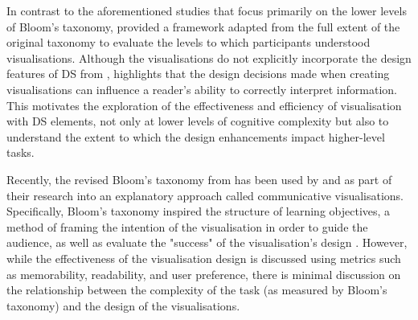 In contrast to the aforementioned studies that focus primarily on the lower levels of Bloom's taxonomy, \citet{burns2020evaluate} provided a framework adapted from the full extent of the original taxonomy to evaluate the levels to which participants understood visualisations. Although the visualisations do not explicitly incorporate the design features of DS from \citet{knaflic2015storytelling}, \citet{burns2020evaluate} highlights that the design decisions made when creating visualisations can influence a reader's ability to correctly interpret information. This motivates the exploration of the effectiveness and efficiency of visualisation with DS elements, not only at lower levels of cognitive complexity but also to understand the extent to which the design enhancements impact higher-level tasks.

Recently, the revised Bloom's taxonomy from \citet{krathwohl2002revision} has been used by \citet{adar2021communicative} and \citet{leerobbins2022learning} as part of their research into an explanatory approach called communicative visualisations. Specifically, Bloom's taxonomy inspired the structure of learning objectives, a method of framing the intention of the visualisation in order to guide the audience, as well as evaluate the "success" of the visualisation's design \cite{adar2021communicative}. However, while the effectiveness of the visualisation design is discussed using metrics such as memorability, readability, and user preference, there is minimal discussion on the relationship between the complexity of the task (as measured by Bloom's taxonomy) and the design of the visualisations. 
